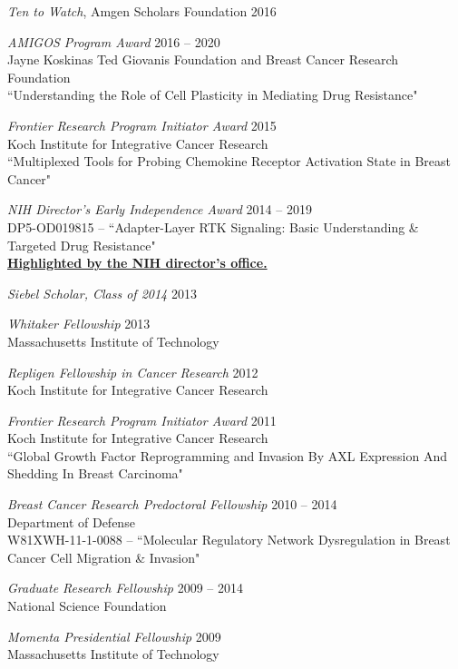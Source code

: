 \documentclass[11pt]{res}
\begin{document}
\begin{resume}
\emph{Ten to Watch}, Amgen Scholars Foundation \hfill 2016

{\sl AMIGOS Program Award} \hfill 2016 -- 2020 \\
Jayne Koskinas Ted Giovanis Foundation and Breast Cancer Research Foundation\\
``Understanding the Role of Cell Plasticity in Mediating Drug Resistance"

{\sl Frontier Research Program Initiator Award} \hfill 2015 \\
Koch Institute for Integrative Cancer Research\\
``Multiplexed Tools for Probing Chemokine Receptor Activation State in Breast Cancer"

{\sl NIH Director's Early Independence Award}  \hfill 2014 -- 2019 \\
DP5-OD019815 -- ``Adapter-Layer RTK Signaling: Basic Understanding \& Targeted Drug Resistance" \\
{\bf \href{https://directorsblog.nih.gov/2014/10/28/creative-minds-tackling-chemotherapy-resistance/}{Highlighted by the NIH director's office.}}

{\sl Siebel Scholar, Class of 2014} \hfill 2013 

{\sl Whitaker Fellowship}  \hfill 2013\\
Massachusetts Institute of Technology

{\sl Repligen Fellowship in Cancer Research} \hfill 2012 \\
Koch Institute for Integrative Cancer Research 

{\sl Frontier Research Program Initiator Award} \hfill 2011 \\
Koch Institute for Integrative Cancer Research\\
``Global Growth Factor Reprogramming and Invasion By AXL Expression And Shedding In Breast Carcinoma"

{\sl Breast Cancer Research Predoctoral Fellowship} \hfill 2010 -- 2014 \\
Department of Defense\\
W81XWH-11-1-0088 -- ``Molecular Regulatory Network Dysregulation in Breast Cancer Cell Migration \& Invasion"

{\sl Graduate Research Fellowship}  \hfill 2009 -- 2014 \\
National Science Foundation

{\sl Momenta Presidential Fellowship} \hfill 2009 \\
Massachusetts Institute of Technology




\end{resume}
\end{document}
